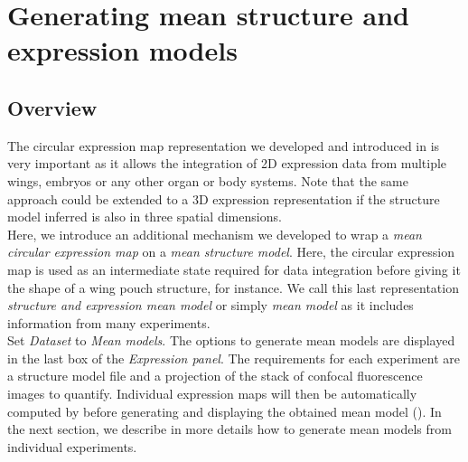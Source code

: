 \section{Generating mean structure and expression models}\label{sec:community_expression_maps}
\subsection{Overview}
The circular expression map representation we developed and introduced in  is very important as it allows the integration of 2D expression data from multiple wings, embryos or any other organ or body systems. Note that the same approach could be extended to a 3D expression representation if the structure model inferred is also in three spatial dimensions.\\

Here, we introduce an additional mechanism we developed to wrap a \textit{mean circular expression map} on a \textit{mean structure model}. Here, the circular expression map is used as an intermediate state required for data integration before giving it the shape of a wing pouch structure, for instance. We call this last representation \textit{structure and expression mean model} or simply \textit{mean model} as it includes information from many experiments.\\

Set \textit{Dataset} to \textit{Mean models}. The options to generate mean models are displayed in the last box of the \textit{Expression panel}. The requirements for each experiment are a \wingj structure model file and a projection of the stack of confocal fluorescence images to quantify. Individual expression maps will then be automatically computed by \wingj before generating and displaying the obtained mean model (). In the next section, we describe in more details how to generate mean models from individual experiments.\\

